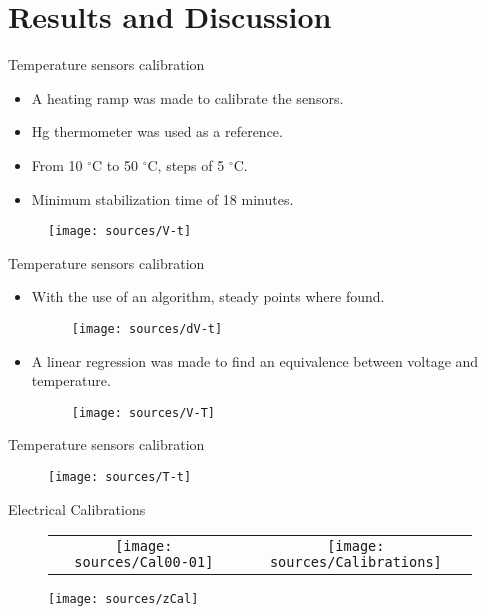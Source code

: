 \documentclass[handout]{beamer}
\begin{document}
\section{Results and Discussion}
\begin{frame}{Temperature sensors calibration}
	\begin{itemize}
		\item A heating ramp was made to calibrate the sensors.
		\item Hg thermometer was used as a reference.
		\item From 10 $^\circ$C to 50 $^\circ$C, steps of 5 $^\circ$C.
		\item Minimum stabilization time of 18 minutes.
	\end{itemize}
	\begin{figure}[h]
		\centering
		\texttt{[image: sources/V-t]}
	\end{figure}
\end{frame}

\begin{frame}{Temperature sensors calibration}
	\begin{itemize}
		\item With the use of an algorithm, steady points where found.
		\begin{figure}[h]
			\centering
			\texttt{[image: sources/dV-t]}
		\end{figure}
		\item A linear regression was made to find an equivalence between voltage and temperature.
		\begin{figure}[h]
			\centering
			\texttt{[image: sources/V-T]}
		\end{figure}
	\end{itemize}
\end{frame}

\begin{frame}{Temperature sensors calibration}
	\begin{figure}[h]
		\centering
		\texttt{[image: sources/T-t]}
	\end{figure}
\end{frame}

\begin{frame}{Electrical Calibrations}
	\begin{figure}[h]
		\centering
		\begin{tabular}{cc}
			\texttt{[image: sources/Cal00-01]} & 
			\texttt{[image: sources/Calibrations]}
		\end{tabular}
		\texttt{[image: sources/zCal]}
	\end{figure}
\end{frame}
\end{document}
